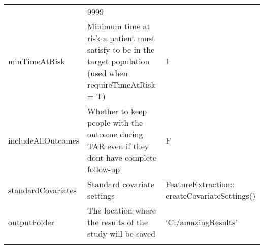 \documentclass[
]{article}
\begin{document}
\begin{longtable}[]{@{}lll@{}}
\begin{minipage}[t]{0.46\columnwidth}
\end{minipage} & \begin{minipage}[t]{0.24\columnwidth}\raggedright
9999\strut
\end{minipage}\tabularnewline
\begin{minipage}[t]{0.21\columnwidth}\raggedright
minTimeAtRisk\strut
\end{minipage} & \begin{minipage}[t]{0.46\columnwidth}\raggedright
Minimum time at risk a patient must satisfy to be in the target
population (used when requireTimeAtRisk = T)\strut
\end{minipage} & \begin{minipage}[t]{0.24\columnwidth}\raggedright
1\strut
\end{minipage}\tabularnewline
\begin{minipage}[t]{0.21\columnwidth}\raggedright
includeAllOutcomes\strut
\end{minipage} & \begin{minipage}[t]{0.46\columnwidth}\raggedright
Whether to keep people with the outcome during TAR even if they dont
have complete follow-up\strut
\end{minipage} & \begin{minipage}[t]{0.24\columnwidth}\raggedright
F\strut
\end{minipage}\tabularnewline
\begin{minipage}[t]{0.21\columnwidth}\raggedright
standardCovariates\strut
\end{minipage} & \begin{minipage}[t]{0.46\columnwidth}\raggedright
Standard covariate settings\strut
\end{minipage} & \begin{minipage}[t]{0.24\columnwidth}\raggedright
FeatureExtraction:: createCovariateSettings()\strut
\end{minipage}\tabularnewline
\begin{minipage}[t]{0.21\columnwidth}\raggedright
outputFolder\strut
\end{minipage} & \begin{minipage}[t]{0.46\columnwidth}\raggedright
The location where the results of the study will be saved\strut
\end{minipage} & \begin{minipage}[t]{0.24\columnwidth}\raggedright
`C:/amazingResults'\strut
\end{minipage}\tabularnewline
\begin{minipage}[t]{0.21\columnwidth}\raggedright

\end{minipage}
\end{longtable}
\end{document}
